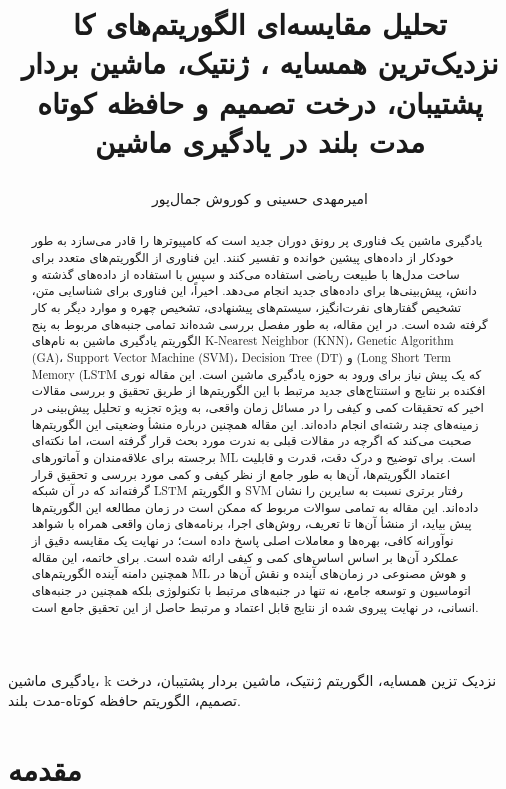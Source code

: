 \documentclass{CSICC2020}
\title{


تحلیل مقایسه‌ای الگوریتم‌های کا نزدیک‌ترین همسایه ، ژنتیک، ماشین بردار پشتیبان، درخت تصمیم و حافظه کوتاه مدت بلند در یادگیری ماشین

}
\date{}
\author[]{امیرمهدی حسینی و کوروش جمال‌پور}
\affil[]{
 دانشگاه دامغان


}
\begin{document}
\maketitle
\begin{abstract}
یادگیری ماشین یک فناوری پر رونق دوران جدید است که کامپیوترها را قادر می‌سازد به طور خودکار از داده‌های پیشین خوانده و تفسیر کنند. این فناوری از الگوریتم‌های متعدد برای ساخت مدل‌ها با طبیعت ریاضی استفاده می‌کند و سپس با استفاده از داده‌های گذشته و دانش، پیش‌بینی‌ها برای داده‌های جدید انجام می‌دهد. اخیراً، این فناوری برای شناسایی متن، تشخیص گفتارهای نفرت‌انگیز، سیستم‌های پیشنهادی، تشخیص چهره و موارد دیگر به کار گرفته شده است. در این مقاله، به طور مفصل بررسی شده‌اند تمامی جنبه‌های مربوط به پنج الگوریتم یادگیری ماشین به نام‌های K-Nearest Neighbor (KNN)، Genetic Algorithm (GA)، Support Vector Machine (SVM)، Decision Tree (DT) و (Long Short Term Memory (LSTM که یک پیش نیاز برای ورود به حوزه یادگیری ماشین است. این مقاله نوری افکنده بر نتایج و استنتاج‌های جدید مرتبط با این الگوریتم‌ها از طریق تحقیق و بررسی مقالات اخیر که تحقیقات کمی و کیفی را در مسائل زمان واقعی، به ویژه تجزیه و تحلیل پیش‌بینی در زمینه‌های چند رشته‌ای انجام داده‌اند. این مقاله همچنین درباره منشأ وضعیتی این الگوریتم‌ها صحبت می‌کند که اگرچه در مقالات قبلی به ندرت مورد بحث قرار گرفته است، اما نکته‌ای برجسته برای علاقه‌مندان و آماتورهای ML است. برای توضیح و درک دقت، قدرت و قابلیت اعتماد الگوریتم‌ها، آن‌ها به طور جامع از نظر کیفی و کمی مورد بررسی و تحقیق قرار گرفته‌اند که در آن شبکه LSTM و الگوریتم SVM رفتار برتری نسبت به سایرین را نشان داده‌اند. این مقاله به تمامی سوالات مربوط که ممکن است در زمان مطالعه این الگوریتم‌ها پیش بیاید، از منشأ آن‌ها تا تعریف، روش‌های اجرا، برنامه‌های زمان واقعی همراه با شواهد نوآورانه کافی، بهره‌ها و معاملات اصلی پاسخ داده است؛ در نهایت یک مقایسه دقیق از عملکرد آن‌ها بر اساس اساس‌های کمی و کیفی ارائه شده است. برای خاتمه، این مقاله همچنین دامنه آینده الگوریتم‌های ML و هوش مصنوعی در زمان‌های آینده و نقش آن‌ها در اتوماسیون و توسعه جامع، نه تنها در جنبه‌های مرتبط با تکنولوژی بلکه همچنین در جنبه‌های انسانی، در نهایت پیروی شده از نتایج قابل اعتماد و مرتبط حاصل از این تحقیق جامع است.
 \end{abstract}
\begin{keywords}
یادگیری ماشین، k نزدیک تزین همسایه، الگوریتم ژنتیک، ماشین بردار پشتیبان، درخت تصمیم، الگوریتم حافظه کوتاه-مدت بلند.
\end{keywords}

\section{مقدمه}
\label{sec:introduction}
\end{document}

